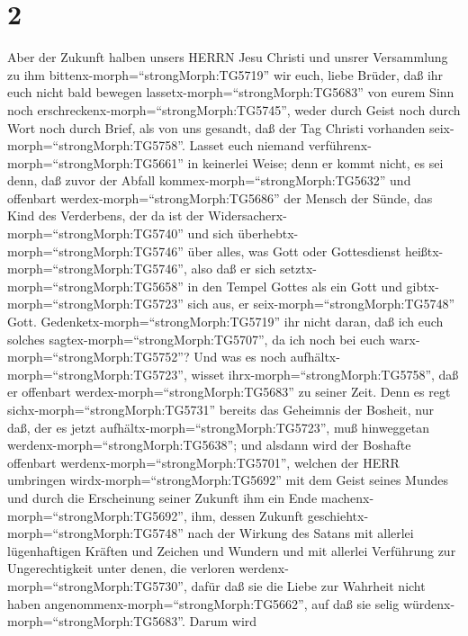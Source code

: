 \hypertarget{section-1}{%
\section{2}\label{section-1}}

 Aber der Zukunft halben unsers HERRN Jesu Christi und
unsrer Versammlung zu ihm bittenx-morph=``strongMorph:TG5719'' wir euch,
liebe Brüder,  daß ihr euch nicht bald bewegen
lassetx-morph=``strongMorph:TG5683'' von eurem Sinn noch
erschreckenx-morph=``strongMorph:TG5745'', weder durch Geist noch durch
Wort noch durch Brief, als von uns gesandt, daß der Tag Christi
vorhanden seix-morph=``strongMorph:TG5758''.  Lasset euch
niemand verführenx-morph=``strongMorph:TG5661'' in keinerlei Weise; denn
er kommt nicht, es sei denn, daß zuvor der Abfall
kommex-morph=``strongMorph:TG5632'' und offenbart
werdex-morph=``strongMorph:TG5686'' der Mensch der Sünde, das Kind des
Verderbens,  der da ist der
Widersacherx-morph=``strongMorph:TG5740'' und sich
überhebtx-morph=``strongMorph:TG5746'' über alles, was Gott oder
Gottesdienst heißtx-morph=``strongMorph:TG5746'', also daß er sich
setztx-morph=``strongMorph:TG5658'' in den Tempel Gottes als ein Gott
und gibtx-morph=``strongMorph:TG5723'' sich aus, er
seix-morph=``strongMorph:TG5748'' Gott. 
Gedenketx-morph=``strongMorph:TG5719'' ihr nicht daran, daß ich euch
solches sagtex-morph=``strongMorph:TG5707'', da ich noch bei euch
warx-morph=``strongMorph:TG5752''?  Und was es noch
aufhältx-morph=``strongMorph:TG5723'', wisset
ihrx-morph=``strongMorph:TG5758'', daß er offenbart
werdex-morph=``strongMorph:TG5683'' zu seiner Zeit.  Denn es
regt sichx-morph=``strongMorph:TG5731'' bereits das Geheimnis der
Bosheit, nur daß, der es jetzt aufhältx-morph=``strongMorph:TG5723'',
muß hinweggetan werdenx-morph=``strongMorph:TG5638'';  und
alsdann wird der Boshafte offenbart
werdenx-morph=``strongMorph:TG5701'', welchen der HERR umbringen
wirdx-morph=``strongMorph:TG5692'' mit dem Geist seines Mundes und durch
die Erscheinung seiner Zukunft ihm ein Ende
machenx-morph=``strongMorph:TG5692'',  ihm, dessen Zukunft
geschiehtx-morph=``strongMorph:TG5748'' nach der Wirkung des Satans mit
allerlei lügenhaftigen Kräften und Zeichen und Wundern  und
mit allerlei Verführung zur Ungerechtigkeit unter denen, die verloren
werdenx-morph=``strongMorph:TG5730'', dafür daß sie die Liebe zur
Wahrheit nicht haben angenommenx-morph=``strongMorph:TG5662'', auf daß
sie selig würdenx-morph=``strongMorph:TG5683''.  Darum wird
